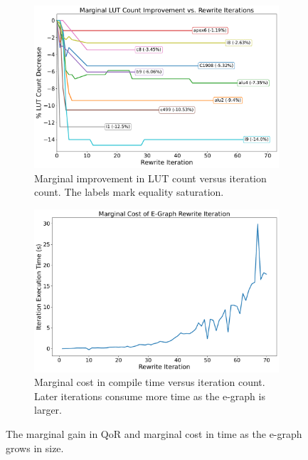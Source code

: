 \begin{figure}
    \begin{subfigure}{0.47\textwidth}
        \centering
        \includegraphics[width=\textwidth]{img/improvement.pdf}
        \caption{Marginal improvement in LUT count versus iteration count. The labels mark equality saturation.}\label{fig:marginal:improvement}
    \end{subfigure}
    \hfill\vspace{4mm}
    \begin{subfigure}{0.47\textwidth}
        \centering
        \includegraphics[width=\textwidth]{img/runtime_derivative.pdf}
        \caption{Marginal cost in compile time versus iteration count. Later iterations consume more time as the e-graph is larger.}\label{fig:marginal:runtime}
    \end{subfigure}
    \caption{The marginal gain in QoR and marginal cost in time as the e-graph grows in size.}\label{fig:marginal}
    \vspace{-0.5mm}
\end{figure}

